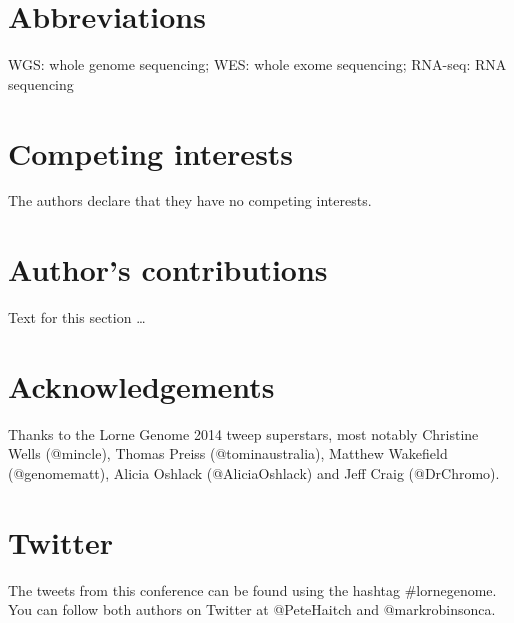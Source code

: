 \documentclass[twocolumn]{bmcart}%
\begin{document}

\begin{backmatter}

\section*{Abbreviations}
WGS: whole genome sequencing; WES: whole exome sequencing; RNA-seq: RNA sequencing

\section*{Competing interests}
  The authors declare that they have no competing interests.

\section*{Author's contributions}
    Text for this section \ldots

\section*{Acknowledgements}
 Thanks to the Lorne Genome 2014 tweep superstars, most notably Christine Wells (@mincle), Thomas Preiss (@tominaustralia), Matthew Wakefield (@genomematt), Alicia Oshlack (@AliciaOshlack) and Jeff Craig (@DrChromo).

\section*{Twitter}
   The tweets from this conference can be found using the hashtag \#lornegenome. You can follow both authors on Twitter at @PeteHaitch and @markrobinsonca.




\end{backmatter}
\end{document}
